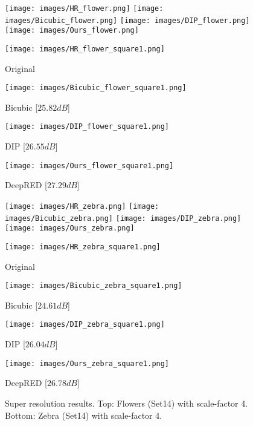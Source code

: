 \documentclass[12pt]{article}
\begin{document}
\begin{figure}[!ht]
\texttt{[image: images/HR\_flower.png]}
\endminipage
\hspace{0.01\textwidth}
  \texttt{[image: images/Bicubic\_flower.png]}
\endminipage\hfill
\hspace{0.01\textwidth}
  \texttt{[image: images/DIP\_flower.png]}
\endminipage\hfill
\hspace{0.01\textwidth}
  \texttt{[image: images/Ours\_flower.png]}
\endminipage\hfill

\texttt{[image: images/HR\_flower\_square1.png]}
  \caption*{Original}
\endminipage
\hspace{0.01\textwidth}
  \texttt{[image: images/Bicubic\_flower\_square1.png]}
  \caption*{Bicubic [$25.82dB$]}
\endminipage\hfill
\hspace{0.01\textwidth}
  \texttt{[image: images/DIP\_flower\_square1.png]}
  \caption*{DIP [$26.55dB$]}
\endminipage\hfill
\hspace{0.01\textwidth}
  \texttt{[image: images/Ours\_flower\_square1.png]}
  \caption*{DeepRED [$27.29dB$]}
\endminipage\hfill

\texttt{[image: images/HR\_zebra.png]}
\endminipage
\hspace{0.01\textwidth}
  \texttt{[image: images/Bicubic\_zebra.png]}
\endminipage\hfill
\hspace{0.01\textwidth}
  \texttt{[image: images/DIP\_zebra.png]}
\endminipage\hfill
\hspace{0.01\textwidth}
  \texttt{[image: images/Ours\_zebra.png]}
\endminipage\hfill

\texttt{[image: images/HR\_zebra\_square1.png]}
  \caption*{Original}
\endminipage
\hspace{0.01\textwidth}
  \texttt{[image: images/Bicubic\_zebra\_square1.png]}
  \caption*{Bicubic [$24.61dB$]}
\endminipage\hfill
\hspace{0.01\textwidth}
  \texttt{[image: images/DIP\_zebra\_square1.png]}
  \caption*{DIP [$26.04dB$]}
\endminipage\hfill
\hspace{0.01\textwidth}
  \texttt{[image: images/Ours\_zebra\_square1.png]}
  \caption*{DeepRED [$26.78dB$]}
\endminipage\hfill

\caption{Super resolution results. Top: \textsf{Flowers} (\textsf{Set14}) with scale-factor 4. Bottom: \textsf{Zebra} (\textsf{Set14}) with scale-factor 4.}
\label{fig:sr}
\end{figure}
\end{document}
